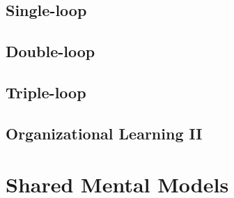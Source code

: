 \subsection{Single-loop}
\subsection{Double-loop} %
\label{sub:double_loop}

\subsection{Triple-loop} %
\label{sub:triple_loop}

\subsection{Organizational Learning II} %
\label{sub:organizational_learning_ii}


\section{Shared Mental Models}
\clearpage

